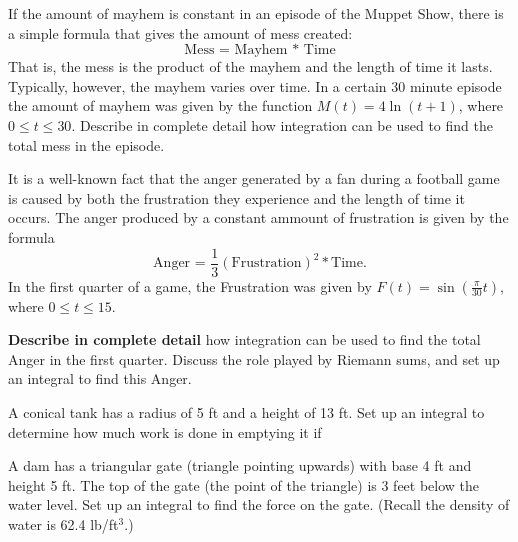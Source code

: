 \documentclass[12pt]{exam}
\begin{document}
\begin{questions}

\question If the amount of mayhem is constant in an episode of the
Muppet Show, there is a simple formula that gives the amount of mess created:
\[
\text{Mess = Mayhem * Time}
\]
That is, the mess is the product of the mayhem and the length of time it lasts.
Typically, however, the mayhem varies over time.  
In a certain 30 minute episode the amount of mayhem was given by the function 
$M(t) = 4 \ln(t+1)$, where $0\leq t\leq 30$.
Describe in complete detail how integration can be used to 
find the total mess in the episode.
\vspace{2.3in}

\question  It is a well-known fact that the anger generated by a fan
during a football game is caused by both the frustration they experience
and the length of time it occurs.  The anger produced by a 
 constant ammount of frustration is given by the formula
\[
\text{Anger = }\frac{1}{3} \left(\text {Frustration}\right)^2 * \text{Time}.
\]
In the first quarter of a game, the Frustration was given by
$\displaystyle F(t)= \sin\left(\frac{\pi}{30} t\right)  $, where $0\leq t\leq 15$.
\vspace{.3in}

\textbf{Describe in complete detail} how integration can be used to find
the total Anger in the first quarter.  Discuss the role played by Riemann 
sums, and set up an integral to find this Anger.
\vspace{2.3in}

\question A conical tank  has a radius of 5 ft and a height of 13 ft.
Set up an integral to determine how much work is done in emptying it if

\question  A dam has a triangular gate (triangle pointing upwards) with base 4 ft
and height 5 ft.
The top of the gate (the point of the triangle) 
is 3 feet below the water level.  Set up an integral
to find the force on
the gate. (Recall the density of water is 62.4 lb/ft$^3$.)
\vspace{2.3in}


\end{questions}
\end{document}
